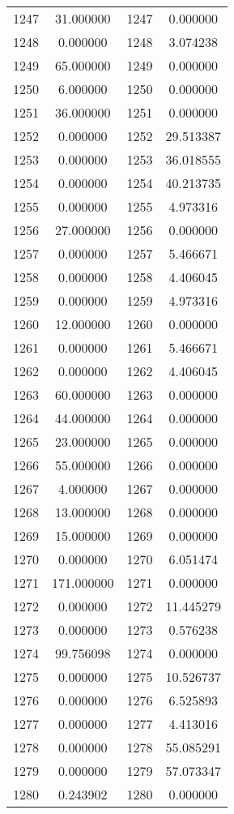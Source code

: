 \documentclass[12pt]{article}
\begin{document}
\begin{longtable}{@{}cccc@{}}
1247 & 31.000000 & 1247 & 0.000000 \\
1248 & 0.000000 & 1248 & 3.074238 \\
1249 & 65.000000 & 1249 & 0.000000 \\
1250 & 6.000000 & 1250 & 0.000000 \\
1251 & 36.000000 & 1251 & 0.000000 \\
1252 & 0.000000 & 1252 & 29.513387 \\
1253 & 0.000000 & 1253 & 36.018555 \\
1254 & 0.000000 & 1254 & 40.213735 \\
1255 & 0.000000 & 1255 & 4.973316 \\
1256 & 27.000000 & 1256 & 0.000000 \\
1257 & 0.000000 & 1257 & 5.466671 \\
1258 & 0.000000 & 1258 & 4.406045 \\
1259 & 0.000000 & 1259 & 4.973316 \\
1260 & 12.000000 & 1260 & 0.000000 \\
1261 & 0.000000 & 1261 & 5.466671 \\
1262 & 0.000000 & 1262 & 4.406045 \\
1263 & 60.000000 & 1263 & 0.000000 \\
1264 & 44.000000 & 1264 & 0.000000 \\
1265 & 23.000000 & 1265 & 0.000000 \\
1266 & 55.000000 & 1266 & 0.000000 \\
1267 & 4.000000 & 1267 & 0.000000 \\
1268 & 13.000000 & 1268 & 0.000000 \\
1269 & 15.000000 & 1269 & 0.000000 \\
1270 & 0.000000 & 1270 & 6.051474 \\
1271 & 171.000000 & 1271 & 0.000000 \\
1272 & 0.000000 & 1272 & 11.445279 \\
1273 & 0.000000 & 1273 & 0.576238 \\
1274 & 99.756098 & 1274 & 0.000000 \\
1275 & 0.000000 & 1275 & 10.526737 \\
1276 & 0.000000 & 1276 & 6.525893 \\
1277 & 0.000000 & 1277 & 4.413016 \\
1278 & 0.000000 & 1278 & 55.085291 \\
1279 & 0.000000 & 1279 & 57.073347 \\
1280 & 0.243902 & 1280 & 0.000000 \\

\end{longtable}
\end{document}
